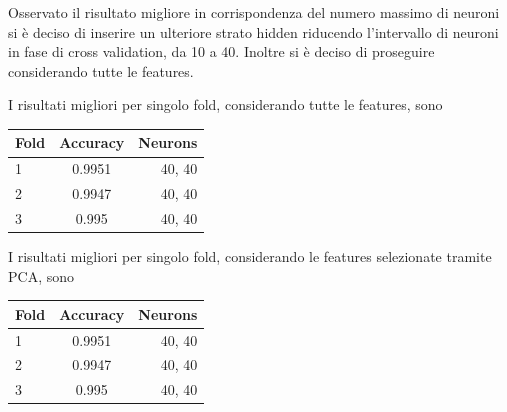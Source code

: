\documentclass[12pt]{report}
\begin{document}
\par\null\par

Osservato il risultato migliore in corrispondenza del numero massimo di neuroni si è deciso di inserire un ulteriore strato hidden riducendo l'intervallo di neuroni in fase di cross validation, da 10 a 40.
Inoltre si è deciso di proseguire considerando tutte le features.

I risultati migliori per singolo fold, considerando tutte le features, sono

\par\null\par

\begin{center}
\begin{tabular}{lcr}
\toprule
Fold & Accuracy & Neurons \\
\midrule
1  & 0.9951 & 40, 40\\
2  & 0.9947 & 40, 40\\
3  & 0.995 & 40, 40\\
\bottomrule
\end{tabular}
\end{center}

\par\null\par
\par\null\par

I risultati migliori per singolo fold, considerando le features selezionate tramite PCA, sono

\par\null\par

\begin{center}
\begin{tabular}{lcr}
\toprule
Fold & Accuracy & Neurons \\
\midrule
1  & 0.9951 & 40, 40\\
2  & 0.9947 & 40, 40\\
3  & 0.995 & 40, 40\\
\bottomrule
\end{tabular}
\end{center}

\par\null\par
\par\null\par
\end{document}
